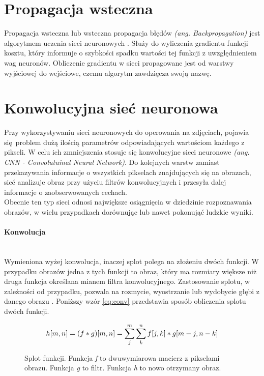 \section{Propagacja wsteczna}
Propagacja wsteczna lub wsteczna propagacja błędów \textit{(ang. Backpropagation)}
jest algorytmem uczenia sieci neuronowych \cite{CS231n_backprop, backprop}.
Służy do wyliczenia gradientu funkcji kosztu, który informuje o szybkości spadku wartości tej funkcji
z uwzględnieniem wag neuronów. Obliczenie gradientu w sieci propagowane
jest od warstwy wyjściowej do wejściowe, czemu algorytm zawdzięcza swoją nazwę.

\section{Konwolucyjna sieć neuronowa}

Przy wykorzystywaniu sieci neuronowych do operowania na zdjęciach, pojawia się problem
dużą ilością parametrów odpowiadających wartościom każdego z pikseli.
W celu ich zmniejszenia stosuje się konwolucyjne sieci neuronowe \textit{(ang. CNN - Convolutuinal Neural Network)}.
Do kolejnych warstw zamiast przekazywania informacje o wszystkich pikselach znajdujących się
na obrazach, sieć analizuje obraz przy użyciu filtrów konwolucyjnych i
przesyła dalej informacje o zaobserwowanych cechach.\\
Obecnie ten typ sieci odnosi największe osiągnięcia w dziedzinie rozpoznawania obrazów,
w wielu przypadkach dorównując lub nawet pokonująć ludzkie wyniki.

\paragraph{Konwolucja} \mbox{}\\
Wymieniona wyżej konwolucja, inaczej splot polega na złożeniu dwóch funkcji. W przypadku obrazów
jedna z tych funkcji to obraz, który ma rozmiary większe niż druga funkcja określana
mianem filtra konwolucyjnego. Zastosowanie splotu, w zależności od przypadku,
pozwala na rozmycie, wyostrzanie lub wydobycie głębi z danego obrazu \cite{konwolucja}.
Poniższy wzór \ref{eq:conv} przedstawia sposób obliczenia splotu dwóch funkcji.
\begin{figure}[h!]
\renewcommand{\figurename}{Wzór}%
\begin{equation} \label{eq:conv}
h[m, n] = (f * g)[m, n] = \sum_j^m \sum_k^n f[j, k] * g[m-j, n-k] \\
\end{equation}
\centering
\captionsetup{justification=centering,margin=1cm}
\caption{Splot funkcji. Funkcja \textit{f} to dwuwymiarowa macierz z pikselami obrazu. Funkcja \textit{g} to filtr. Funkcja \textit{h} to nowo otrzymany obraz.}
\end{figure}

